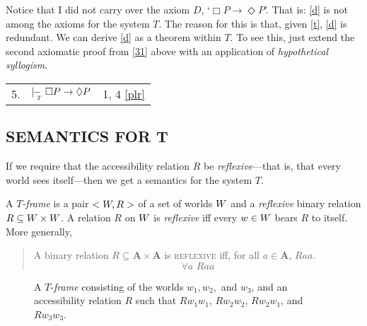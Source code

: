 \documentclass[landscape, two column, full page,reqno]{article}
\let\mathcal\relax
\newcommand{\mathcal}{\OMScal}%
\newcommand{\qd}{\begin{quote}\begin{description}  [align=left,style=nextline,leftmargin=*,labelsep=0pt,font=\normalfont]}
\newcommand{\zd}{\end{description}\end{quote}}
\newcommand{\p}{\item}
\newcommand{\e}{\emph}
\newcommand{\mbf}{\mathbf}
\newcommand{\s}{\textsc}
\newcommand{\fns}[1]{{\footnotesize #1}}
\newcommand{\W}{\mathcal{W}}
\newcommand{\tproves}{\mid\hspace{-3.9pt}-_{\!\!\!\raisebox{-3pt}{\text{\tiny$T$}}}\hspace{3pt}}
\newcommand{\D}{\Diamond}
\newcommand{\B}{\Box}
\newcommand{\hs}{\hspace{2pt}}
\begin{document}
	
\p Notice that I did not carry over the axiom $D$, `$\B P \to \D P$'.  That is: \eqref{d} is not among the axioms for the system $T$.  The reason for this is that, given \eqref{t}, \eqref{d} is redundant.  We can derive \eqref{d} as a theorem within $T$.  To see this,  just extend the second axiomatic proof from \ref{31} above with an  application of \e{hypothetical syllogism}.
	\begin{center}
\begin{tabularx}{250pt}{l X l}
5. & $\tproves \B P \to \D P$							&1, 4 \eqref{plr}
\end{tabularx}	
\end{center}

\subsection{S\fns{EMANTICS} F\fns{OR} T}

If we require that the accessibility relation $R$ be \e{reflexive}---that is, that every world sees itself---then we get a semantics for the system $T$.

\p A \e{$T$-frame} is a pair $< \mathcal{W}, R >$ of a set of worlds $\mathcal{W}$ and a \e{reflexive} binary relation $R \subseteq \mathcal{W} \times \mathcal{W}$.  A relation $R$ on $\W$ is \e{reflexive} iff every $w \in \W$ bears $R$ to itself.  More generally,
	\qd
	\p[\s{reflexivity}] A binary relation $R \subseteq \mbf{A} \times \mbf{A}$ is \s{reflexive} iff, for all $a \in \mbf{A}$, $Raa$.
		\[
		\forall a \hs\hs Raa
		\]
	\zd

\begin{figure}[t]
\centering
{}

\caption{\small A $T$-\e{frame} consisting of the worlds $w_1, w_2,$ and  $w_3$,  and an accessibility relation $R$ such that $R w_1  w_1$, $R w_2 w_2$, $R w_2 w_1$, and $R w_3  w_3$.}\label{fig:frame3}
\end{figure}
\end{document}
